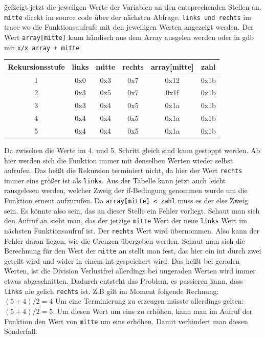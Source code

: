 \documentclass[12pt]{article}
\begin{document}

\"gef\" zeigt jetzt die jeweilgen Werte der Variablen an den entsprechenden Stellen an. \texttt{mitte} direkt im source code über der nächsten Abfrage. \texttt{links und rechts} im trace wo die Funktionsaufrufe mit den jeweiligen Werten angezeigt werden. Der Wert \texttt{array[mitte]} kann händisch aus dem Array ausgelen werden oder in gdb mit \texttt{x/x array + mitte}

\begin{tabular}{c | c | c | c | c | c}
Rekursionsstufe & links & mitte & rechts & array[mitte] & zahl\\
\hline
1 & 0x0 & 0x3 & 0x7 & 0x12 & 0x1b \\
2 & 0x3 & 0x5 & 0x7 & 0x1f & 0x1b \\
3 & 0x3 & 0x4 & 0x5 & 0x1a & 0x1b \\
4 & 0x4 & 0x4 & 0x5 & 0x1a & 0x1b \\
5 & 0x4 & 0x4 & 0x5 & 0x1a & 0x1b \\
\end{tabular}

Da zwischen die Werte im 4. und 5. Schritt gleich sind kann gestoppt werden. Ab hier werden sich die Funktion immer mit denselben Werten wieder selbst aufrufen. Das heißt die Rekursion terminiert nicht, da hier der Wert \texttt{rechts} immer eins größer ist als \texttt{links}. Aus der Tabelle kann jetzt auch leicht rausgelesen werden, welcher Zweig der if-Bedingung genommen wurde um die Funktion erneut aufzurufen.
Da \texttt{array[mitte] < zahl} muss es der else Zweig sein. Es könnte also sein, das an dieser Stelle ein Fehler vorliegt.
Schaut man sich den Aufruf an sieht man, das der jetzige \texttt{mitte} Wert der neue \texttt{links} Wert im nächsten Funktionsaufruf ist. Der \texttt{rechts} Wert wird übernommen. Also kann der Fehler daran liegen, wie die Grenzen übergeben werden. Schaut man sich die Berechnung für den Wert der \texttt{mitte} an stellt man fest, das hier ein int durch zwei geteilt wird und wider in einem int gespeichert wird. Das heißt bei geraden Werten, ist die Division Verlustfrei allerdings bei ungeraden Werten wird immer etwas abgeschnitten. Dadurch entsteht das Problem, es passieren kann, dass \texttt{links} nie gelich \texttt{rechts} ist. Z.B gilt im Moment folgende Rechnung: $(5 + 4)/2 = 4$ Um eine Terminierung zu erzeugen müsste allerdings gelten: $(5 + 4)/2 = 5$. Um diesen Wert um eins zu erhöhen, kann man im Aufruf der Funktion den Wert von \texttt{mitte} um eins erhöhen. Damit verhindert man diesen Sonderfall.
\end{document}
